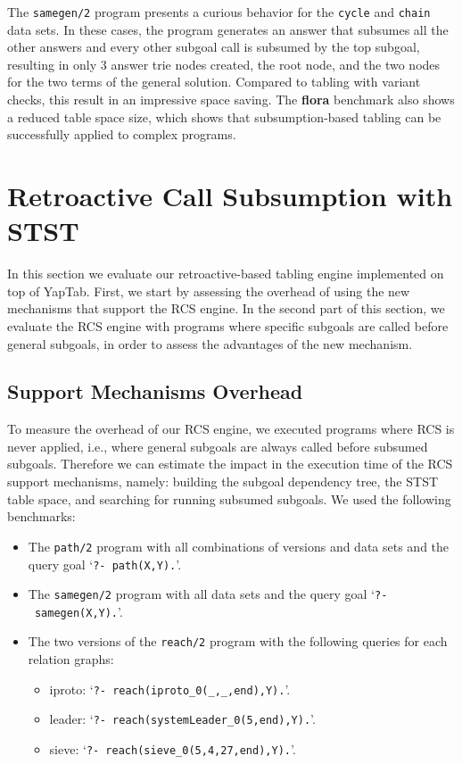 

The \texttt{samegen/2} program presents a curious behavior for the \texttt{cycle} and \texttt{chain}
data sets. In these cases, the program generates an answer that subsumes all the other answers and
every other subgoal call is subsumed by the top subgoal, resulting in only 3 answer trie nodes created,
the root node, and the two nodes for the two terms of the general solution. Compared to tabling with
variant checks, this result in an impressive space saving.
The \textbf{flora} benchmark also shows a reduced table space size, which shows that subsumption-based
tabling can be successfully applied to complex programs.

\section{Retroactive Call Subsumption with STST}

In this section we evaluate our retroactive-based tabling engine implemented on
top of YapTab. First, we start by assessing the overhead of using the new mechanisms that
support the RCS engine. In the second part of this section, we evaluate
the RCS engine with programs where specific subgoals are called before general subgoals, in
order to assess the advantages of the new mechanism.

\subsection{Support Mechanisms Overhead}

To measure the overhead of our RCS engine, we executed programs where RCS is never applied, i.e., where
general subgoals are always called before subsumed subgoals. Therefore we can estimate the impact in the
execution time of the RCS support mechanisms, namely: building the subgoal dependency tree, the STST table space,
and searching for running subsumed subgoals.
We used the following benchmarks:

\begin{itemize}
   \item The \texttt{path/2} program with all combinations of versions and data sets and the query goal `\texttt{?-~path(X,Y).}'.
   
   \item The \texttt{samegen/2} program with all data sets and the query goal `\texttt{?-~samegen(X,Y).}'.
   
   \item The two versions of the \texttt{reach/2} program with the following queries for each relation graphs:

   \begin{itemize}
      \item iproto: `\texttt{?-~reach(iproto\_0(\_,\_,end),Y).}'.
      \item leader: `\texttt{?-~reach(systemLeader\_0(5,end),Y).}'.
      \item sieve: `\texttt{?-~reach(sieve\_0(5,4,27,end),Y).}'.
   \end{itemize}

\end{itemize}

